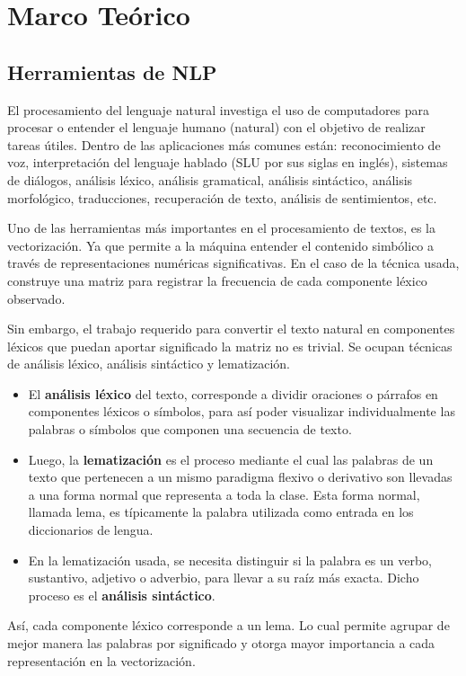 \section{Marco Teórico}
{
\subsection{Herramientas de NLP}
El procesamiento del lenguaje natural investiga el uso de computadores para procesar o entender el lenguaje humano (natural) con el objetivo de realizar tareas útiles. Dentro de las aplicaciones más comunes están: reconocimiento de voz, interpretación del lenguaje hablado (SLU por sus siglas en inglés), sistemas de diálogos, análisis léxico, análisis gramatical, análisis sintáctico, análisis morfológico, traducciones, recuperación de texto, análisis de sentimientos, etc. 

Uno de las herramientas más importantes en el procesamiento de textos, es la vectorización. Ya que permite a la máquina entender el contenido simbólico a través de representaciones numéricas significativas. En el caso de la técnica usada, construye una matriz para registrar la frecuencia de cada componente léxico observado. 

Sin embargo, el trabajo requerido para convertir el texto natural en componentes léxicos que puedan aportar significado  la matriz no es trivial. Se ocupan técnicas de análisis léxico, análisis sintáctico y lematización. 

\begin{itemize}
    \item El \textbf{análisis léxico} del texto, corresponde a dividir oraciones o párrafos en componentes léxicos o símbolos, para así poder visualizar individualmente las palabras o símbolos que componen una secuencia de texto. 
    \item Luego, la \textbf{lematización} es el proceso mediante el cual las palabras de un texto que pertenecen a un mismo paradigma flexivo o derivativo son llevadas a una forma normal que representa a toda la clase. Esta forma normal, llamada lema, es típicamente la palabra utilizada como entrada en los diccionarios de lengua. 
    \item En la lematización usada, se necesita distinguir si la palabra es un verbo, sustantivo, adjetivo o adverbio, para llevar a su raíz más exacta. Dicho proceso es el \textbf{análisis sintáctico}. 
\end{itemize}

Así, cada componente léxico corresponde a un lema. Lo cual permite agrupar de mejor manera las palabras por significado y otorga mayor importancia a cada representación en la vectorización. 

}

